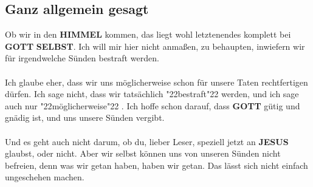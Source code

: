 \documentclass[12pt,a5paper]{article}
\newcommand{\Gott}[0]{\textbf{GOTT}}
\newcommand{\Himmel}[0]{\textbf{HIMMEL}}
\newcommand{\Jesus}[0]{\textbf{JESUS}}
\newcommand{\Selbst}[0]{\textbf{SELBST}}
\newcommand{\q}[1]{\char"22{#1}\char"22 }
\begin{document}
	\subsection{Ganz allgemein gesagt}
		Ob wir in den {\Himmel} kommen,
		das liegt wohl letztenendes komplett bei {\Gott} {\Selbst}.
		Ich will mir hier nicht anma{\ss}en,
		zu behaupten,
		inwiefern wir f\"ur irgendwelche S\"unden bestraft werden.
		\\
		\\
		Ich glaube eher,
		dass wir uns m\"oglicherweise schon f\"ur unsere Taten rechtfertigen d\"urfen.
		Ich sage nicht,
		dass wir tats\"achlich \q{bestraft} werden,
		und ich sage auch nur \q{m\"oglicherweise}.
		Ich hoffe schon darauf,
		dass {\Gott} g\"utig und gn\"adig ist,
		und uns unsere S\"unden vergibt.
		\\
		\\
		Und es geht auch nicht darum,
		ob du,
		lieber Leser,
		speziell jetzt an {\Jesus} glaubst,
		oder nicht.
		Aber wir selbst k\"onnen uns von unseren S\"unden nicht befreien,
		denn was wir getan haben,
		haben wir getan.
		Das l\"asst sich nicht einfach ungeschehen machen.
		
\end{document}
